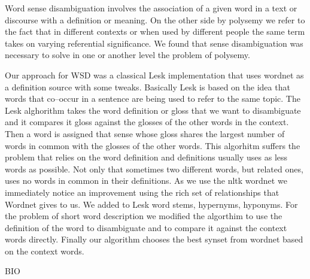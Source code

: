 Word sense disambiguation involves the association of a given word in a text or discourse with a definition or meaning.
On the other side by polysemy we refer to the fact that in different contexts or when used by different people the same term takes on varying referential significance.
We found that sense disambiguation was necessary to solve in one or another level the problem of polysemy.


Our approach for WSD was a classical Lesk implementation that uses wordnet as a definition source with some tweaks.
Basically Lesk is based on the idea that words that co–occur in a sentence are being used to refer to the same topic.
The Lesk alghorithm \cite{LESK} takes the word definition or gloss that we want to disambiguate and it compares it gloss against the glosses of the other words in the context.
Then a word is assigned that sense whose gloss shares the largest number of words in common with the glosses of the other words.
This algorhitm suffers the problem that relies on the word definition and definitions usually uses as less words as possible.
Not only that sometimes two different words, but related ones, uses no words in common in their definitions.
As we use the nltk wordnet we immediately notice an improvement using the rich set of relationships that Wordnet gives to us.
We added to Lesk word stems, hypernyms, hyponyms.
For the problem of short word description we modified the algorthim to use the definition of the word to disambiguate and to compare it against the context words directly.
Finally our algorithm chooses the best synset from wordnet based on the context words.

BIO
